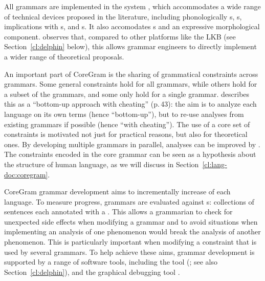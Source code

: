 \documentclass[output=paper
                ,modfonts
                ,nonflat
	        ,collection
	        ,collectionchapter
	        ,collectiontoclongg
 	        ,biblatex
                ,babelshorthands
                ,newtxmath
                ,draftmode
                ,colorlinks, citecolor=brown
]{./langsci/langscibook}
\begin{document}
All grammars are implemented
in the  system \citep{MPR2002a-u,Penn2004a-u},
which accommodates a wide range of technical devices proposed in the literature, including
phonologically s,
s,
implications with s,
and s.
It also accomodates s and an expressive morphological component.
\citet{MelnikHandWritten} observes that,
compared to other platforms like the LKB (see Section~\ref{cl:delphin} below),
this allows grammar engineers to directly implement a wider range of theoretical proposals.

An important part of CoreGram is the sharing of grammatical constraints across grammars.
Some general constraints hold for all grammars,
while others hold for a subset of the grammars,
and some only hold for a single grammar.
\citet{MuellerCoreGram} describes this as a
``bottom-up approach with cheating'' (p.\,43):
the aim is to analyze each language on its own terms (hence ``bottom-up''),
but to re-use analyses from existing grammars if possible (hence ``with cheating'').
The use of a core set of constraints is motivated not just for practical reasons,
but also for theoretical ones.
By developing multiple grammars in parallel,
analyses can be improved by .
The constraints encoded in the core grammar
can be seen as a hypothesis about the structure of human language,
as we will discuss in Section~\ref{cl:lang-doc:coregram}.

CoreGram grammar development aims to incrementally increase  of each language.
To measure progress, grammars are evaluated against s:
collections of sentences each annotated with a  \citep{ONK97a,Mueller2004f}.
This allows a grammarian to check for unexpected side effects when modifying a grammar and
to avoid situations when implementing an analysis of one phenomenon
would break the analysis of another phenomenon.
This is particularly important when modifying a constraint that is used by several grammars.
To help achieve these aims, grammar development is supported by a range of software tools,
including the  tool \itsdb\is{\itsdb} (\citealp{Oepen:01}; see also Section~\ref{cl:delphin}),
and the graphical debugging tool  \citep{DER2010a-u,DER2013a}.
\end{document}

